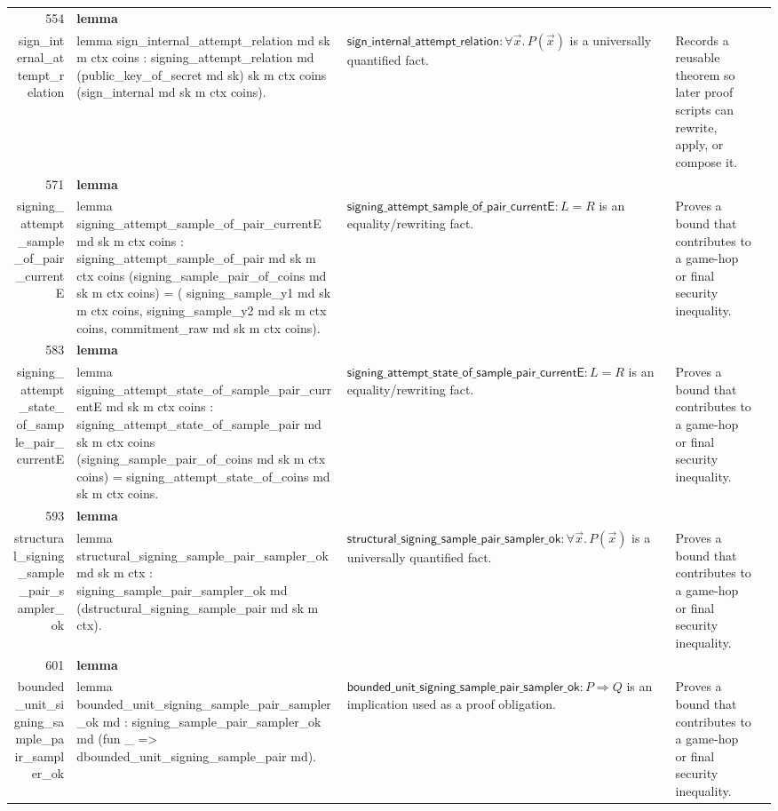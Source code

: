 \documentclass[10pt]{article}
\newcommand{\ec}[1]{\begingroup\ttfamily\scriptsize #1\endgroup}
\begin{document}
\begin{longtable}{r L{0.17\textwidth} L{0.26\textwidth} L{0.27\textwidth} L{0.20\textwidth}}
554 & \textbf{lemma}\\\ec{sign\_internal\_attempt\_relation} & \ec{lemma sign\_internal\_attempt\_relation md sk m ctx coins : signing\_attempt\_relation md (public\_key\_of\_secret md sk) sk m ctx coins (sign\_internal md sk m ctx coins).} & \(\mathsf{sign\_internal\_attempt\_relation} : \forall \vec{x}.\, P(\vec{x})\) is a universally quantified fact. & Records a reusable theorem so later proof scripts can rewrite, apply, or compose it. \\
571 & \textbf{lemma}\\\ec{signing\_attempt\_sample\_of\_pair\_currentE} & \ec{lemma signing\_attempt\_sample\_of\_pair\_currentE md sk m ctx coins : signing\_attempt\_sample\_of\_pair md sk m ctx coins (signing\_sample\_pair\_of\_coins md sk m ctx coins) = ( signing\_sample\_y1 md sk m ctx coins, signing\_sample\_y2 md sk m ctx coins, commitment\_raw md sk m ctx coins).} & \(\mathsf{signing\_attempt\_sample\_of\_pair\_currentE} : L = R\) is an equality/rewriting fact. & Proves a bound that contributes to a game-hop or final security inequality. \\
583 & \textbf{lemma}\\\ec{signing\_attempt\_state\_of\_sample\_pair\_currentE} & \ec{lemma signing\_attempt\_state\_of\_sample\_pair\_currentE md sk m ctx coins : signing\_attempt\_state\_of\_sample\_pair md sk m ctx coins (signing\_sample\_pair\_of\_coins md sk m ctx coins) = signing\_attempt\_state\_of\_coins md sk m ctx coins.} & \(\mathsf{signing\_attempt\_state\_of\_sample\_pair\_currentE} : L = R\) is an equality/rewriting fact. & Proves a bound that contributes to a game-hop or final security inequality. \\
593 & \textbf{lemma}\\\ec{structural\_signing\_sample\_pair\_sampler\_ok} & \ec{lemma structural\_signing\_sample\_pair\_sampler\_ok md sk m ctx : signing\_sample\_pair\_sampler\_ok md (dstructural\_signing\_sample\_pair md sk m ctx).} & \(\mathsf{structural\_signing\_sample\_pair\_sampler\_ok} : \forall \vec{x}.\, P(\vec{x})\) is a universally quantified fact. & Proves a bound that contributes to a game-hop or final security inequality. \\
601 & \textbf{lemma}\\\ec{bounded\_unit\_signing\_sample\_pair\_sampler\_ok} & \ec{lemma bounded\_unit\_signing\_sample\_pair\_sampler\_ok md : signing\_sample\_pair\_sampler\_ok md (fun \_ => dbounded\_unit\_signing\_sample\_pair md).} & \(\mathsf{bounded\_unit\_signing\_sample\_pair\_sampler\_ok} : P \Rightarrow Q\) is an implication used as a proof obligation. & Proves a bound that contributes to a game-hop or final security inequality. \\

\end{longtable}
\end{document}
